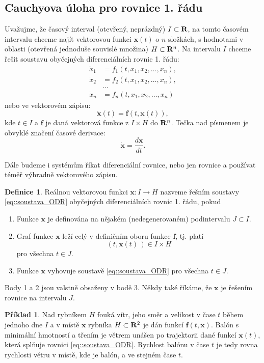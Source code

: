 \documentclass[a4paper, 12pt]{book}
\theoremstyle{definition}
\newtheorem{definition}[theorem]{Definice}
\newtheorem{example}[theorem]{Příklad}
\def\to{\rightarrow}
\def\Real{{\rm\bf R}}
\def\vc#1{\mathbf{\boldsymbol{#1}}}     %
\begin{document}
\subsection{Cauchyova úloha pro rovnice 1. řádu}
Uvažujme, že časový interval (otevřený, neprázdný) $I \subset \Real$, 
na tomto časovém intervalu chceme najít vektorovou funkci $\vc x(t)$ o $n$ složkách, s hodnotami 
v oblasti (otevřená jednoduše souvislé množina) $H \subset \Real^n$. Na intervalu $I$ chceme řešit 
soustavu obyčejných diferenciálních rovnic 1. řádu:
\begin{align}
\dot x_1 &= f_1(t, x_1, x_2, \dots, x_n),\\
\dot x_2 &= f_2(t, x_1, x_2, \dots, x_n),\\
&\dots\\
\dot x_n &= f_n(t, x_1, x_2, \dots, x_n)
\end{align}
nebo ve vektorovém zápisu:
\begin{equation}
    \label{eq::soustava_ODR}
    \dot{\vc x}(t) = \vc f(t, \vc x(t) ),
\end{equation}
kde $t\in I$ a $\vc f$ je daná vektorová funkce z $I\times H$ do $\Real^n$. Tečka nad písmenem je obvyklé značení časové derivace:
\[
    \dot{\vc x}= \frac{d \vc x}{dt}.
\]

Dále budeme i systémům říkat diferenciální rovnice, nebo jen rovnice a používat téměř výhradně vektorového zápisu.


\begin{definition}
Reálnou vektorovou funkci $\vc x: I \to H$ nazveme řešním soustavy \eqref{eq::soustava_ODR} 
obyčejných diferenciálních rovnic 1. řádu, pokud
\begin{enumerate}
\item Funkce $\vc x$ je definována na nějakém (nedegenerovaném) podintervalu $J\subset I$. 
\item Graf funkce $\vc x$ leží celý v definičním oboru funkce $\vc f$, tj. 
platí 
\[
    (t, \vc x (t)\,)  \in I \times H 
\]
 pro všechna $t\in J$.
\item Funkce $\vc x$ vyhovuje soustavě \eqref{eq::soustava_ODR} pro všechna $t\in J$. 
\end{enumerate}
\end{definition}

Body 1 a 2 jsou valstně obsaženy v bodě 3.
Někdy také říkáme, že $\vc x$ je řešením rovnice na intervalu $J$.

\begin{example}
\label{balon}
Nad rybníkem $H$ fouká vítr, jeho směr a velikost v čase $t$ během jednoho dne $I$ a v místě $\vc x$ rybníka  $H\subset \Real^2$
je dán funkcí $\vc f(t, \vc x)$. Balón s minimální hmotností a třením je větrem unášen po trajektorii dané funkcí $\vc x(t)$,
která splňuje rovnici \eqref{eq::soustava_ODR}. 
Rychlost balónu v čase $t$ je tedy rovna rychlosti větru v místě, kde je balón, a ve stejném čase $t$.
\end{example}
\end{document}
